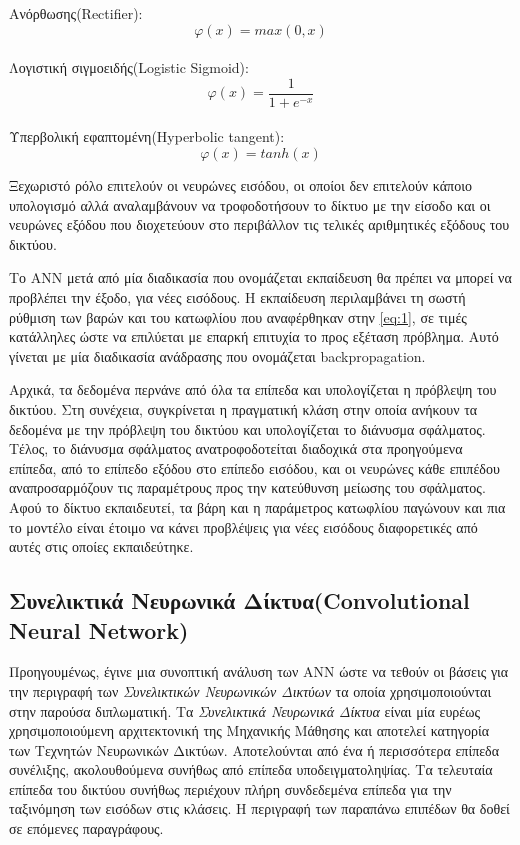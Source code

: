 Ανόρθωσης(Rectifier): 
\begin{equation} \label{eq:Rectifier}
φ(x) = max(0, x)
\end{equation}
\\


Λογιστική σιγμοειδής(Logistic Sigmoid): 
\begin{equation} \label{eq:Sigmoid}
φ(x) = \frac{1}{1+ e^{-x}}
\end{equation}
\\


Υπερβολική εφαπτομένη(Hyperbolic tangent): 
\begin{equation} \label{eq:tanh}
φ(x) = tanh(x)
\end{equation}

Ξεχωριστό ρόλο επιτελούν οι νευρώνες εισόδου, οι οποίοι δεν επιτελούν κάποιο υπολογισμό αλλά αναλαμβάνουν να τροφοδοτήσουν το δίκτυο με την είσοδο και οι νευρώνες εξόδου που διοχετεύουν στο περιβάλλον τις τελικές αριθμητικές εξόδους του δικτύου.

 
Το ANN μετά από μία διαδικασία που ονομάζεται εκπαίδευση θα πρέπει να μπορεί να προβλέπει την έξοδο, για νέες εισόδους. Η εκπαίδευση περιλαμβάνει τη σωστή ρύθμιση των βαρών και του κατωφλίου που αναφέρθηκαν στην \ref{eq:1}, σε τιμές κατάλληλες ώστε να επιλύεται με επαρκή επιτυχία το προς εξέταση πρόβλημα. Αυτό γίνεται με μία διαδικασία ανάδρασης που ονομάζεται backpropagation.


Αρχικά, τα δεδομένα περνάνε από όλα τα επίπεδα και υπολογίζεται η πρόβλεψη του δικτύου. Στη συνέχεια, συγκρίνεται η πραγματική κλάση στην οποία ανήκουν τα δεδομένα με την πρόβλεψη του δικτύου και υπολογίζεται το διάνυσμα σφάλματος. Τέλος, το διάνυσμα σφάλματος ανατροφοδοτείται διαδοχικά στα προηγούμενα επίπεδα, από το επίπεδο εξόδου στο επίπεδο εισόδου, και οι νευρώνες κάθε επιπέδου αναπροσαρμόζουν τις παραμέτρους προς την κατεύθυνση μείωσης του σφάλματος. Αφού το δίκτυο εκπαιδευτεί, τα βάρη και η παράμετρος κατωφλίου παγώνουν και πια το μοντέλο είναι έτοιμο να κάνει προβλέψεις για νέες εισόδους διαφορετικές από αυτές στις οποίες εκπαιδεύτηκε.
    




\subsection{Συνελικτικά Νευρωνικά Δίκτυα(Convolutional Neural Network)}
\label{subsec:3.1.3}



Προηγουμένως, έγινε μια συνοπτική ανάλυση των ANN ώστε να τεθούν οι βάσεις για την περιγραφή των \textit{Συνελικτικών Νευρωνικών Δικτύων} τα οποία χρησιμοποιούνται στην παρούσα διπλωματική. Τα \textit{Συνελικτικά Νευρωνικά Δίκτυα} είναι μία ευρέως χρησιμοποιούμενη αρχιτεκτονική της Μηχανικής Μάθησης και αποτελεί κατηγορία των Τεχνητών Νευρωνικών Δικτύων.
Αποτελούνται από ένα ή περισσότερα επίπεδα συνέλιξης, ακολουθούμενα συνήθως από επίπεδα υποδειγματοληψίας. Τα τελευταία επίπεδα του δικτύου συνήθως περιέχουν πλήρη συνδεδεμένα επίπεδα για την ταξινόμηση των εισόδων στις κλάσεις.
Η περιγραφή των παραπάνω επιπέδων θα δοθεί σε επόμενες παραγράφους.


